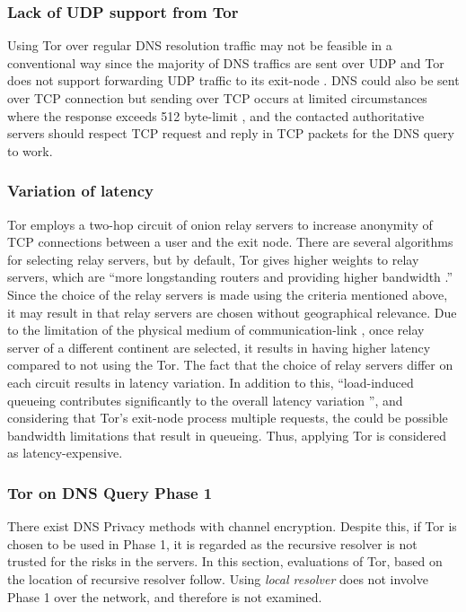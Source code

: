 \subsubsection{Lack of UDP support from Tor}\label{no-udp-tor}
Using Tor over regular DNS resolution traffic may not be feasible in a conventional way since the majority of DNS traffics are sent over UDP and Tor does not support forwarding UDP traffic to its exit-node \cite{udp-over-tor, dingledine2004tor}.
DNS could also be sent over TCP connection but sending over TCP occurs at limited circumstances where the response exceeds 512 byte-limit \cite{rfc7766}, and the contacted authoritative servers should respect TCP request and reply in TCP packets for the DNS query to work.

\subsubsection{Variation of latency}
Tor employs a two-hop circuit of onion relay servers to increase anonymity of TCP connections between a user and the exit node.
There are several algorithms for selecting relay servers, but by default, Tor gives higher weights to relay servers, which are ``more longstanding routers and providing higher bandwidth \cite{wacek2013empirical}.''
Since the choice of the relay servers is made using the criteria mentioned above, it may result in that relay servers are chosen without geographical relevance.
Due to the limitation of the physical medium of communication-link \cite{Singla:2014:ISL}, once relay server of a different continent are selected, it results in having higher latency compared to not using the Tor.
The fact that the choice of relay servers differ on each circuit results in latency variation. In addition to this, ``load-induced queueing contributes significantly to the overall latency variation \cite{Hoiland-Jorgensen:2016}'', and considering that Tor's exit-node process multiple requests, the could be possible bandwidth limitations that result in queueing.
Thus, applying Tor is considered as latency-expensive.

\subsubsection{Tor on DNS Query Phase 1}
There exist DNS Privacy methods with channel encryption. Despite this, if Tor is chosen to be used in Phase 1, it is regarded as the recursive resolver is not trusted for the risks in the servers.
In this section, evaluations of Tor, based on the location of recursive resolver follow. Using \textit{local resolver} does not involve Phase 1 over the network, and therefore is not examined.

